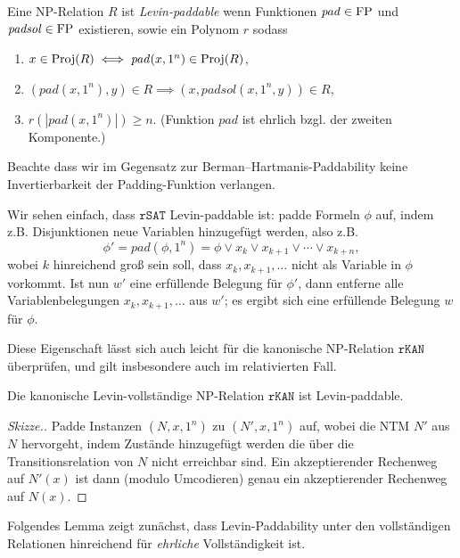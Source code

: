 \begin{definition}\label{def:levin-paddable}
    Eine NP-Relation $R$ ist \emph{Levin-paddable} wenn 
    Funktionen $\mathit{pad}\in\mathrm{FP}$ und $\mathit{padsol}\in\mathrm{FP}$ existieren, sowie ein Polynom $r$ sodass
    \begin{enumerate}
        \item $x\in \operatorname{Proj}(R) \iff \mathit{pad}(x, 1^n) \in \operatorname{Proj}(R)$,
        \item $(\mathit{pad}(x, 1^n), y)\in R \implies (x, \mathit{padsol}(x, 1^n, y)) \in R$,
        \item $r(|\mathit{pad}(x, 1^n)|)\geq n$. (Funktion $\mathit{pad}$ ist ehrlich bzgl. der zweiten Komponente.)\qedhere
    \end{enumerate}
\end{definition}
Beachte dass wir im Gegensatz zur Berman–Hartmanis-Paddability keine Invertierbarkeit der Padding-Funktion verlangen.

Wir sehen einfach, dass $\mathtt{rSAT}$ Levin-paddable ist: padde Formeln $\phi$ auf, indem z.B. Disjunktionen neue Variablen hinzugefügt werden, also z.B. 
\[ \phi' = \mathit{pad}(\phi, 1^n) = \phi \lor x_k \lor x_{k+1} \lor \cdots \lor x_{k+n}, \]
wobei $k$ hinreichend groß sein soll, dass $x_k, x_{k+1}, \dots$ nicht als Variable in $\phi$ vorkommt.
Ist nun $w'$ eine erfüllende Belegung für $\phi'$, dann entferne alle Variablenbelegungen $x_{k}, x_{k+1}, \dots$ aus $w'$; es ergibt sich eine erfüllende Belegung $w$ für $\phi$.

Diese Eigenschaft lässt sich auch leicht für die kanonische NP-Relation $\mathtt{rKAN}$ überprüfen, und gilt insbesondere auch im relativierten Fall.
\begin{observation}\label{obs:rkan-paddable}
    Die kanonische Levin-vollständige NP-Relation $\mathtt{rKAN}$ ist Levin-paddable.
\end{observation}
\begin{proof}[Skizze.]
    Padde Instanzen $(N, x, 1^n)$ zu $(N', x, 1^n)$ auf, wobei die NTM $N'$ aus $N$ hervorgeht, indem Zustände hinzugefügt werden die über die Transitionsrelation von $N$ nicht erreichbar sind. Ein akzeptierender Rechenweg auf $N'(x)$ ist dann (modulo Umcodieren) genau ein akzeptierender Rechenweg auf $N(x)$.
\end{proof}

Folgendes Lemma zeigt zunächst, dass Levin-Paddability unter den vollständigen Relationen hinreichend für \emph{ehrliche} Vollständigkeit ist.

